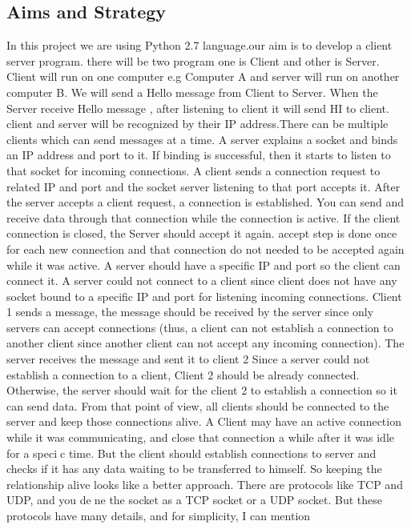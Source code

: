 \documentclass[11pt,a4paper]{article}
\begin{document}
\subsection{Aims and Strategy}
In this project we are using Python 2.7 language.our aim is to develop a
client server program. there will be two program one is Client and other is
Server. Client will run on one computer e.g Computer A and server will run
on another computer B. We will send a Hello message from Client to Server.
When the Server receive Hello message , after listening to client it will send
HI to client. client and server will be recognized by their IP address.There
can be multiple clients which can send messages at a time. A server explains
a socket and binds an IP address and port to it. If binding is successful, then
it starts to listen to that socket for incoming connections. A client sends a
connection request to related IP and port and the socket server listening to
that port accepts it. After the server accepts a client request, a connection
is established. You can send and receive data through that connection while
the connection is active. If the client connection is closed, the Server should
accept it again. accept step is done once for each new connection and that
connection do not needed to be accepted again while it was active. A server
should have a specific IP and port so the client can connect it. A server could
not connect to a client since client does not have any socket bound to a specific
IP and port for listening incoming connections. Client 1 sends a message,
the message should be received by the server since only servers can accept
connections (thus, a client can not establish a connection to another client
since another client can not accept any incoming connection). The server
receives the message and sent it to client 2 Since a server could not establish
a connection to a client, Client 2 should be already connected. Otherwise,
the server should wait for the client 2 to establish a connection so it can send
data. From that point of view, all clients should be connected to the server
and keep those connections alive. A Client may have an active connection
while it was communicating, and close that connection a while after it was
idle for a specic time. But the client should establish connections to server
and checks if it has any data waiting to be transferred to himself. So keeping
the relationship alive looks like a better approach. There are protocols like
TCP and UDP, and you dene the socket as a TCP socket or a UDP socket.
But these protocols have many details, and for simplicity, I can mention
\end{document}
